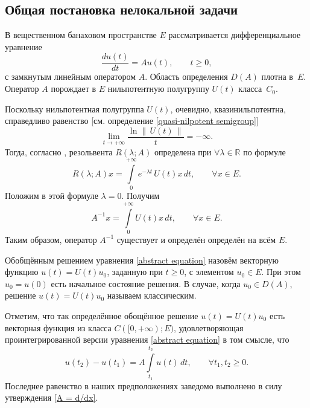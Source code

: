 \documentclass{article}
\renewcommand{\ge}{\geqslant}
\theoremstyle{definition}
\begin{document}
\subsection{Общая постановка нелокальной задачи}
В вещественном банаховом пространстве $E$ рассматривается дифференциальное уравнение
\begin{equation} \label{abstract equation}
	\frac{du(t)}{dt} = Au(t), \qquad t \ge 0,
\end{equation}
с замкнутым линейным оператором $A$. Область определения $D(A)$ плотна в~$E$. Оператор $A$ порождает в $E$ нильпотентную полугруппу $U(t)$ класса~$C_0$.

Поскольку нильпотентная полугруппа $U(t)$, очевидно, квазинильпотентна, справедливо равенство
[см. определение \ref{quasi-nilpotent semigroup}]
\begin{equation*}
	\lim\limits_{t \rightarrow +\infty} \frac{\ln \|\, U(t) \, \|}{t} = -\infty.
\end{equation*}
Тогда, согласно \cite[теорема VIII.1.11]{Dunford_Schwartz}, резольвента $R(\lambda; A)$ определена при 
$\forall \lambda \in \mathbb{R}$ по формуле
\begin{equation*}
	R(\lambda; A)x = \int\limits_{0}^{+\infty}e^{-\lambda t}\,U(t)x\,dt, \qquad \forall x \in E.
\end{equation*}
Положим в этой формуле $\lambda = 0$. Получим
\begin{equation*}
	A^{-1}x = \int\limits_{0}^{+\infty}U(t)x\,dt, \qquad \forall x \in E.
\end{equation*}
Таким образом, оператор $A^{-1}$ существует и определён определён на всём $E$.

Обобщённым решением уравнения \eqref{abstract equation} назовём векторную функцию \linebreak 
$ u(t) = U(t)u_0 $, заданную при $ t \ge 0 $, с элементом $ u_0 \in E $. 
При этом $ u_0 = u(0) $ есть начальное состояние решения. 
В случае, когда $ u_0 \in D(A) $, решение $ u(t) = U(t)u_0 $ называем классическим.

Отметим, что так определённое обощённое решение $u(t) = U(t)u_0$ есть векторная функция из класса 
$C([0, +\infty); E)$, удовлетворяющая проинтегрированной версии уравнения \eqref{abstract equation} в том смысле, что
\begin{equation*}
	u(t_2) - u(t_1) = A\int\limits_{t_1}^{t_2} u(t) \,dt, \qquad \forall t_1, t_2 \ge 0.
\end{equation*}
Последнее равенство в наших предположениях заведомо выполнено в силу утверждения \ref{A = d/dx}.
\end{document}
